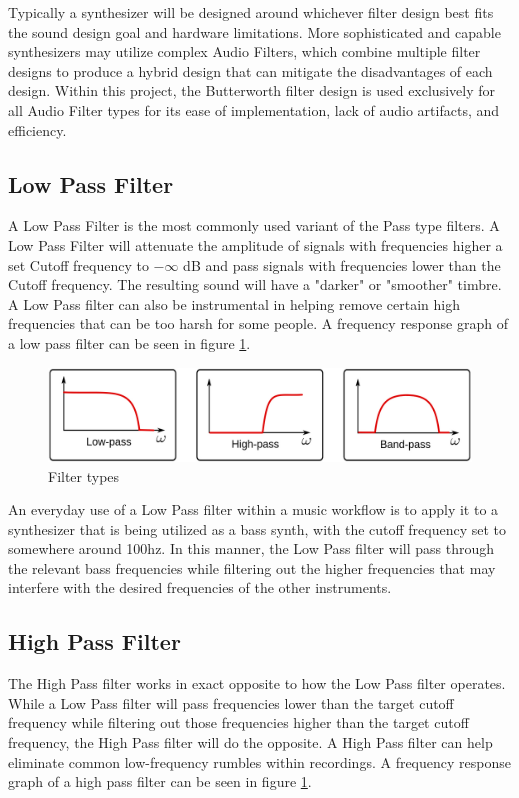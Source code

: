 \documentclass[a4paper,12pt]{report}
\begin{document}
Typically a synthesizer will be designed around whichever filter design best fits the sound design goal and hardware limitations. More sophisticated and capable synthesizers may utilize complex Audio Filters, which combine multiple filter designs to produce a hybrid design that can mitigate the disadvantages of each design. Within this project, the Butterworth filter design is used exclusively for all Audio Filter types for its ease of implementation, lack of audio artifacts, and efficiency.

\subsection{Low Pass Filter}
\label{subsec:lowpassfilter}
A Low Pass Filter is the most commonly used variant of the Pass type filters. A Low Pass Filter will attenuate the amplitude of signals with frequencies higher a set Cutoff frequency to $-\infty$ dB and pass signals with frequencies lower than the Cutoff frequency. The resulting sound will have a "darker" or "smoother" timbre. A Low Pass filter can also be instrumental in helping remove certain high frequencies that can be too harsh for some people. A frequency response graph of a low pass filter can be seen in figure \ref{fig:FilterTypes}.

\begin{figure}
    \centering
    \includegraphics[width=36em]{FilterTypes.jpg}
    \caption{Filter types}
    \label{fig:FilterTypes}
\end{figure}

An everyday use of a Low Pass filter within a music workflow is to apply it to a synthesizer that is being utilized as a bass synth, with the cutoff frequency set to somewhere around 100hz. In this manner, the Low Pass filter will pass through the relevant bass frequencies while filtering out the higher frequencies that may interfere with the desired frequencies of the other instruments.

\subsection{High Pass Filter}
\label{subsec:highpassfilter}
The High Pass filter works in exact opposite to how the Low Pass filter operates. While a Low Pass filter will pass frequencies lower than the target cutoff frequency while filtering out those frequencies higher than the target cutoff frequency, the High Pass filter will do the opposite. A High Pass filter can help eliminate common low-frequency rumbles within recordings. A frequency response graph of a high pass filter can be seen in figure \ref{fig:FilterTypes}.
\end{document}
